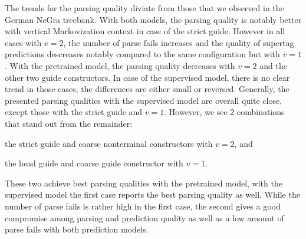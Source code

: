 \documentclass[../../document.tex]{subfiles}
\begin{document}
    The trends for the parsing quality diviate from those that we observed in the German NeGra treebank.
    With both models, the parsing quality is notably better with vertical Markovization context in case of the strict guide.
    However in all cases with $v=2$, the number of parse fails increases and the quality of supertag predictions descreases notably compared to the same configuration but with $v=1$.
    With the pretrained model, the parsing quality decreases with $v=2$ and the other two guide constructors.
    In case of the supervised model, there is no clear trend in those cases, the differences are either small or reversed.
    Generally, the presented parsing qualities with the supervised model are overall quite close, except those with the strict guide and $v=1$.
    However, we see 2 combinations that stand out from the remainder:
    \begin{compactitem}
        \item the strict guide and coarse nonterminal constructors with $v=2$, and
        \item the head guide and coarse guide constructor with $v=1$.
    \end{compactitem}
    These two achieve best parsing qualities with the pretrained model, with the supervised model the first case reports the best parsing quality as well.
    While the number of parse fails is rather high in the first case, the second gives a good compromise among parsing and prediction quality as well as a low amount of parse fails with both prediction models.
\end{document}
